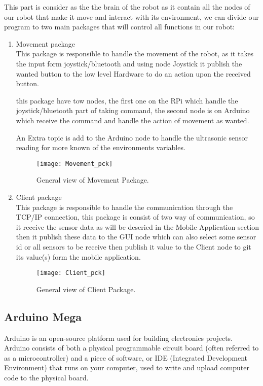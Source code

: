 	This part is consider as the the brain of the robot as it contain all the nodes of our robot that make it move and interact with its environment, we can divide our program to two main packages that will control all functions in our robot:
	
	\begin{enumerate}
		\item Movement package \\ 
			This package is responsible to handle the movement of the robot, as it takes the input form joystick/bluetooth and using node Joystick it publish the wanted button to the low level Hardware to do an action upon the received button.
			
			this package have tow nodes, the first one on the RPi which handle the joystick/bluetooth part of taking command, the second node is on Arduino which receive the command and handle the action of movement as wanted.
			
			An Extra topic is add to the Arduino node to handle the ultrasonic sensor reading for more known of the environments variables. 
			\begin{figure}[h]		
				\centering
				\texttt{[image: Movement\_pck]}
				\caption{General view of Movement Package.}
				\label{Fig:Movement}
			\end{figure}
		\item Client package  \\
			This package is responsible to handle the communication through the TCP/IP connection, this package is consist of two way of communication, so it receive the sensor data as will be descried in the Mobile Application section then it publish these data to the GUI node which can also select some sensor id or all sensors to be receive then publish it value to the Client node to git its value(s) form the mobile application.
			\begin{figure}[h]		
				\centering
				\texttt{[image: Client\_pck]}
				\caption{General view of Client Package.}
				\label{Fig:Client}
			\end{figure}  
	\end{enumerate}

\subsection{Arduino Mega}
Arduino is an open-source platform used for building electronics projects. Arduino consists of both a physical programmable circuit board (often referred to as a microcontroller) and a piece of software, or IDE (Integrated Development Environment) that runs on your computer, used to write and upload computer code to the physical board.

